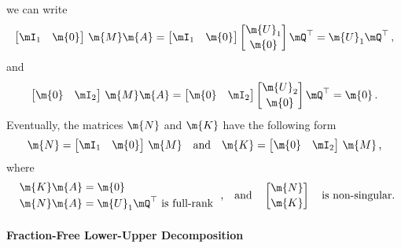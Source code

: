 %
we can write
%
\begin{equation*}
  \begin{bmatrix} \mI_1 & \m{0} \end{bmatrix} \, \m{M}\m{A} =
  \begin{bmatrix} \mI_1 & \m{0} \end{bmatrix}
  \begin{bmatrix} \m{U}_1 \\[0.2em] \m{0} \end{bmatrix} \mQ^\top = \m{U}_1 \mQ^\top \, \text{,}
\end{equation*}
%
and
%
\begin{equation*}
  \begin{bmatrix} \m{0} & \mI_2 \end{bmatrix} \, \m{M}\m{A} =
  \begin{bmatrix} \m{0} & \mI_2 \end{bmatrix}
  \begin{bmatrix} \m{U}_2 \\[0.2em] \m{0} \end{bmatrix} \mQ^\top = \m{0} \, \text{.}
\end{equation*}
%
Eventually, the matrices $\m{N}$ and $\m{K}$ have the following form
%
\begin{equation*}
  \m{N} = \begin{bmatrix} \mI_1 & \m{0} \end{bmatrix} \, \m{M}
  \quad \text{and} \quad
  \m{K} = \begin{bmatrix} \m{0} & \mI_2 \end{bmatrix} \, \m{M} \, \text{,}
\end{equation*}
%
where
%
\begin{equation*}
  \begin{array}{l}
      \m{K}\m{A} = \m{0} \\[0.2em]
      \m{N}\m{A} = \m{U}_1 \mQ^\top ~ \text{is full-rank}
  \end{array} \, \text{,}
  \quad \text{and} \quad
  \begin{bmatrix} \m{N} \\[0.2em] \m{K} \end{bmatrix} \quad \text{is non-singular.}
\end{equation*}

\paragraph{Fraction-Free Lower-Upper Decomposition}

